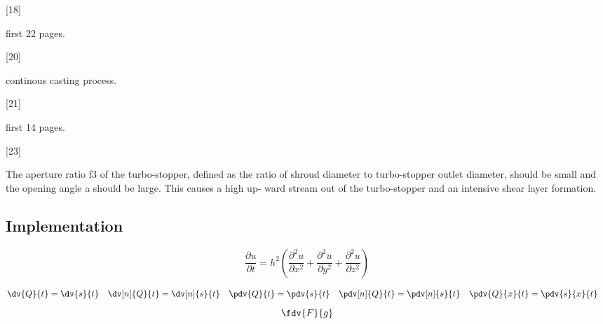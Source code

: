 [18]

first 22 pages.

[20]

continous casting process.

[21]

first 14 pages. 

[23]

The aperture ratio f3 of the
turbo-stopper, defined as the ratio of shroud diameter to
turbo-stopper outlet diameter, should be small and the
opening angle a should be large. This causes a high up-
ward stream out of the turbo-stopper and an intensive
shear layer formation.

\pagebreak

\subsection{Implementation}

\[ \frac{\partial u}{\partial t}
   = h^2 \left( \frac{\partial^2 u}{\partial x^2}
      + \frac{\partial^2 u}{\partial y^2}
      + \frac{\partial^2 u}{\partial z^2} \right) \]

\[
\dv{Q}{t} = \dv{s}{t}  \quad
\dv[n]{Q}{t} = \dv[n]{s}{t}  \quad
\pdv{Q}{t} = \pdv{s}{t}  \quad
\pdv[n]{Q}{t} = \pdv[n]{s}{t}  \quad
\pdv{Q}{x}{t} = \pdv{s}{x}{t}  \quad
\]
\[
\fdv{F}{g}
\]
